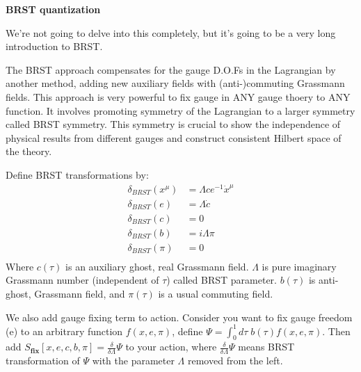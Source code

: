\documentclass[11pt]{article}
\begin{document}
\begin{enumerate}
\begin{problem}{\points{-}}
	
\end{problem}

\begin{problem}{\points{-}}
	\textbf{BRST quantization} 
	
	\noindent
	We're not going to delve into this completely, but it's going to be a very long introduction to BRST.
	
	\noindent
	 The BRST approach compensates for the gauge D.O.Fs in the Lagrangian by another method, adding new auxiliary fields with (anti-)commuting Grassmann fields. This approach is very powerful to fix gauge in ANY gauge thoery to ANY function. It involves promoting symmetry of the Lagrangian to a larger symmetry called BRST symmetry. This symmetry is crucial to show the independence of  physical results from different gauges and construct consistent Hilbert space of the theory.
	 
	 \noindent
	 Define BRST transformations by:
	 \begin{equation}
	 	\begin{aligned}
	 		\delta_{BRST} (x^\mu) &= \Lambda c e^{-1}\dot{x}^\mu \\
	 		\delta_{BRST} (e) & = \Lambda \dot{c} \\
	 		\delta_{BRST} (c) & = 0 \\
	 		\delta_{BRST} (b) & = i\Lambda \pi \\
	 		\delta_{BRST} (\pi) & = 0 \\
	 	\end{aligned}
	 \end{equation}
	Where $c(\tau)$ is an auxiliary ghost, real Grassmann field. $\Lambda$ is pure imaginary Grassmann number (independent of $\tau$) called BRST parameter. $b(\tau)$ is anti-ghost, Grassmann field, and $\pi(\tau)$ is a usual commuting field.
	
	\noindent
	We also add gauge fixing term to action. Consider you want to fix gauge freedom (e) to an arbitrary function $f(x,e,\pi)$, define $\Psi = \int_0^1 d\tau\; b(\tau) f(x,e,\pi)$. Then add $S_{\textbf{fix}}[x,e,c,b,\pi] = \frac{\delta}{\delta \Lambda} \Psi$ to your action, where $\frac{\delta}{\delta \Lambda} \Psi$ means BRST transformation of $\Psi$ with the parameter $\Lambda$ removed from the left.
	

\end{problem}
\end{enumerate}
\end{document}
